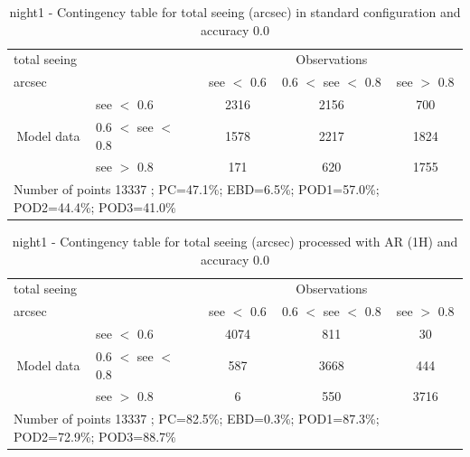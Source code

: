 \clearpage
\begin{table}[p!]
\begin{center}
\begin{tabular}{llccc}
\hline
{total seeing}                                       &                                                    & \multicolumn{3}{c}{Observations}                 \\
{arcsec}                                       &                             & see $<$ 0.6   & 0.6 $<$ see $<$ 0.8 & see $>$ 0.8 \\
\hline
\multicolumn{1}{c}{\multirow{3}{*}{Model data}}  & see $<$ 0.6             & 2316                & 2156                       & 700              \\
                                                 & 0.6  $<$ see $<$ 0.8 & 1578                & 2217                       & 1824              \\
                                                 & see $>$ 0.8             & 171                & 620                       & 1755              \\
\hline
\multicolumn{5}{l}{ Number of points        13337 ; PC=47.1\%; EBD=6.5\%; POD1=57.0\%; POD2=44.4\%; POD3=41.0\%}
\end{tabular}
\end{center}
\caption{night1 - Contingency table for  total seeing (arcsec) in standard configuration and accuracy 0.0}
\label{tab:contingencyseeBEF:night1}
\end{table}
\begin{table}[p!]
\begin{center}
\begin{tabular}{llccc}
\hline
{total seeing}                                       &                                                    & \multicolumn{3}{c}{Observations}                 \\
{arcsec}                                       &                             & see $<$ 0.6   & 0.6 $<$ see $<$ 0.8 & see $>$ 0.8 \\
\hline
\multicolumn{1}{c}{\multirow{3}{*}{Model data}}  & see $<$ 0.6             & 4074                & 811                       & 30              \\
                                                 & 0.6  $<$ see $<$ 0.8 & 587                & 3668                       & 444              \\
                                                 & see $>$ 0.8             & 6                & 550                       & 3716              \\
\hline
\multicolumn{5}{l}{ Number of points        13337 ; PC=82.5\%; EBD=0.3\%; POD1=87.3\%; POD2=72.9\%; POD3=88.7\%}
\end{tabular}
\end{center}
\caption{night1 - Contingency table for  total seeing (arcsec) processed with AR (1H) and accuracy 0.0}
\label{tab:contingencyseeAFT:night1}
\end{table}
